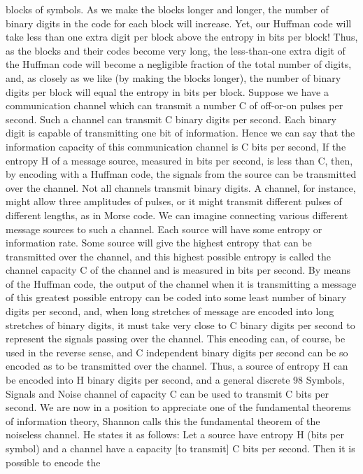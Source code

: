 {{{blocks of symbols. As we make the blocks longer and longer, the
number of binary digits in the code for each block will increase.
Yet, our Huffman code will take less than one extra digit per block
above the entropy in bits per block! Thus, as the blocks and their
codes become very long, the less-than-one extra digit of the Huffman
code will become a negligible fraction of the total number of
digits, and, as closely as we like (by making the blocks longer), the
number of binary digits per block will equal the entropy in bits
per block.
Suppose we have a communication channel which can transmit
a number C of off-or-on pulses per second. Such a channel can
transmit C binary digits per second. Each binary digit is capable
of transmitting one bit of information. Hence we can say that the
information capacity of this communication channel is C bits per
second, If the entropy H of a message source, measured in bits per
second, is less than C, then, by encoding with a Huffman code, the
signals from the source can be transmitted over the channel.
Not all channels transmit binary digits. A channel, for instance,
might allow three amplitudes of pulses, or it might transmit different
pulses of different lengths, as in Morse code. We can imagine
connecting various different message sources to such a channel.
Each source will have some entropy or information rate. Some
source will give the highest entropy that can be transmitted over
the channel, and this highest possible entropy is called the channel
capacity C of the channel and is measured in bits per second.
By means of the Huffman code, the output of the channel when
it is transmitting a message of this greatest possible entropy can
be coded into some least number of binary digits per second, and,
when long stretches of message are encoded into long stretches of
binary digits, it must take very close to C binary digits per second
to represent the signals passing over the channel.
This encoding can, of course, be used in the reverse sense, and
C independent binary digits per second can be so encoded as to
be transmitted over the channel. Thus, a source of entropy H can
be encoded into H binary digits per second, and a general discrete
98 Symbols, Signals and Noise
channel of capacity C can be used to transmit C bits per second.
We are now in a position to appreciate one of the fundamental
theorems of information theory, Shannon calls this the fundamental
theorem of the noiseless channel. He states it as follows:
Let a source have entropy H (bits per symbol) and a channel have a
capacity [to transmit] C bits per second. Then it is possible to encode the
}}}
